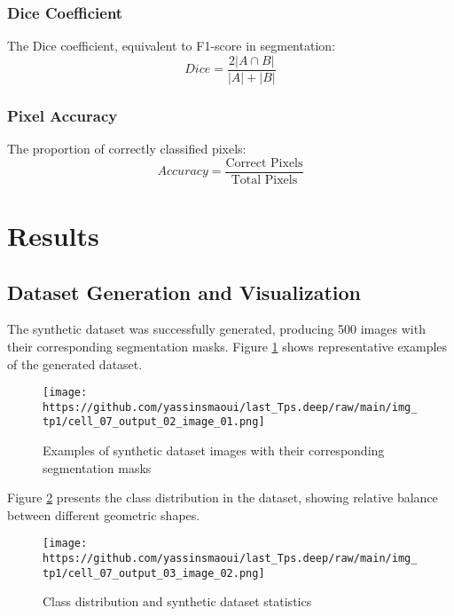 \documentclass[12pt,a4paper]{article}
\begin{document}
\subsubsection{Dice Coefficient}

The Dice coefficient, equivalent to F1-score in segmentation:
\begin{equation}
Dice = \frac{2|A \cap B|}{|A| + |B|}
\end{equation}

\subsubsection{Pixel Accuracy}

The proportion of correctly classified pixels:
\begin{equation}
Accuracy = \frac{\text{Correct Pixels}}{\text{Total Pixels}}
\end{equation}

\section{Results}

\subsection{Dataset Generation and Visualization}

The synthetic dataset was successfully generated, producing 500 images with their corresponding segmentation masks. Figure \ref{fig:dataset_examples} shows representative examples of the generated dataset.

\begin{figure}[H]
    \centering
    \texttt{[image: https://github.com/yassinsmaoui/last\_Tps.deep/raw/main/img\_tp1/cell\_07\_output\_02\_image\_01.png]}
    \caption{Examples of synthetic dataset images with their corresponding segmentation masks}
    \label{fig:dataset_examples}
\end{figure}

Figure \ref{fig:dataset_distribution} presents the class distribution in the dataset, showing relative balance between different geometric shapes.

\begin{figure}[H]
    \centering
    \texttt{[image: https://github.com/yassinsmaoui/last\_Tps.deep/raw/main/img\_tp1/cell\_07\_output\_03\_image\_02.png]}
    \caption{Class distribution and synthetic dataset statistics}
    \label{fig:dataset_distribution}
\end{figure}
\end{document}
